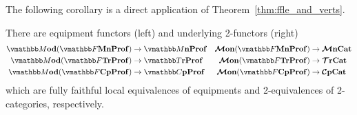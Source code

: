 \documentclass[11pt,oneside,article]{memoir}
\begin{document}
The following corollary is a direct application of Theorem~\ref{thm:ffle_and_verts}.

\begin{corollary}\label{cor:TrCat_ObjectFree}
There are equipment functors (left) and underlying 2-functors (right)
\begin{align*}
   \dMod(\dFrMonProf)  &\to \dMonProf  & \MMon(\dFrMonProf)  &\to \MMonCat \\
   \dMod(\dFrTrProf)   &\to \dTrProf   & \MMon(\dFrTrProf)   &\to \TTrCat  \\
   \dMod(\dFrCompProf) &\to \dCompProf & \MMon(\dFrCompProf) &\to \CCompCat
\end{align*}
which are fully faithful local equivalences of equipments and 2-equivalences of 2-categories, respectively.
\end{corollary}
\end{document}
